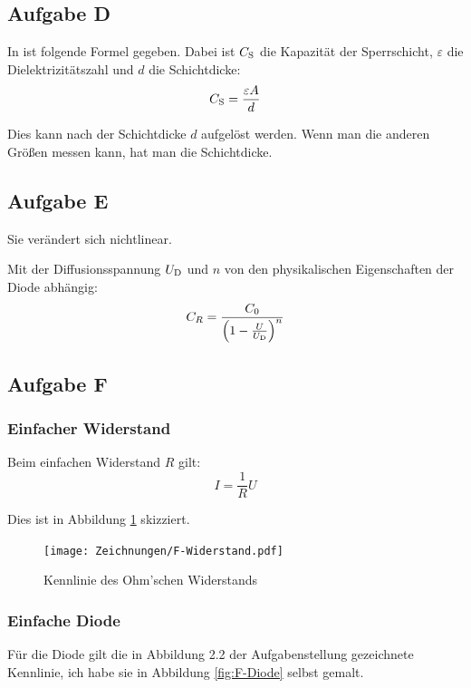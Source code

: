 \subsection{Aufgabe D}

In \cite[§~6.1]{schenke/bauelemente} ist folgende Formel gegeben. Dabei ist
$C_\text S$ die Kapazität der Sperrschicht, $\varepsilon$ die
Dielektrizitätszahl und $d$ die Schichtdicke:
\[
	C_\text S = \frac{\varepsilon A}d
\]

Dies kann nach der Schichtdicke $d$ aufgelöst werden. Wenn man die anderen
Größen messen kann, hat man die Schichtdicke.

\subsection{Aufgabe E}

Sie verändert sich nichtlinear. \cite[§~15.2.2]{beuth/elementare_elektronik}

Mit der Diffusionsspannung $U_\text D$ und $n$ von den physikalischen
Eigenschaften der Diode abhängig:
\cite[§~1.1.1.1.2]{antula/schaltungen_mikroelektronik}
\[
	C_R = \frac{C_0}{\del{1- \frac U{U_\text D}}^n}
\]

\subsection{Aufgabe F}

\subsubsection{Einfacher Widerstand}

Beim einfachen Widerstand $R$ gilt:
\[
	I = \frac 1R U
\]

Dies ist in Abbildung \ref{fig:F-Widerstand} skizziert.

\begin{figure}[h]
	\centering
	\caption{%
		Kennlinie des Ohm'schen Widerstands
	}
	\label{fig:F-Widerstand}
	\texttt{[image: Zeichnungen/F-Widerstand.pdf]}
\end{figure}

\subsubsection{Einfache Diode}

Für die Diode gilt die in Abbildung 2.2 der Aufgabenstellung gezeichnete
Kennlinie, ich habe sie in Abbildung \ref{fig:F-Diode} selbst gemalt.

